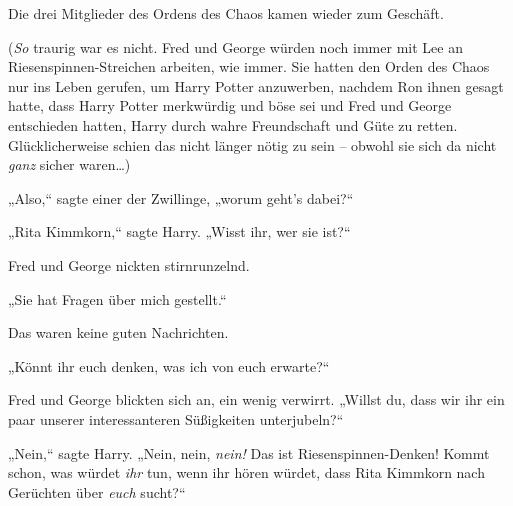 Die drei Mitglieder des Ordens des Chaos kamen wieder zum Geschäft.

(\emph{So} traurig war es nicht. Fred und George würden noch immer mit Lee an Riesenspinnen-Streichen arbeiten, wie immer. Sie hatten den Orden des Chaos nur ins Leben gerufen, um Harry Potter anzuwerben, nachdem Ron ihnen gesagt hatte, dass Harry Potter merkwürdig und böse sei und Fred und George entschieden hatten, Harry durch wahre Freundschaft und Güte zu retten. Glücklicherweise schien das nicht länger nötig zu sein -- obwohl sie sich da nicht \emph{ganz} sicher waren…)

„Also,“ sagte einer der Zwillinge, „worum geht's dabei?“

„Rita Kimmkorn,“ sagte Harry. „Wisst ihr, wer sie ist?“

Fred und George nickten stirnrunzelnd.

„Sie hat Fragen über mich gestellt.“

Das waren keine guten Nachrichten.

„Könnt ihr euch denken, was ich von euch erwarte?“

Fred und George blickten sich an, ein wenig verwirrt. „Willst du, dass wir ihr ein paar unserer interessanteren Süßigkeiten unterjubeln?“

„Nein,“ sagte Harry. „Nein, nein, \emph{nein!} Das ist Riesenspinnen-Denken! Kommt schon, was würdet \emph{ihr} tun, wenn ihr hören würdet, dass Rita Kimmkorn nach Gerüchten über \emph{euch} sucht?“

